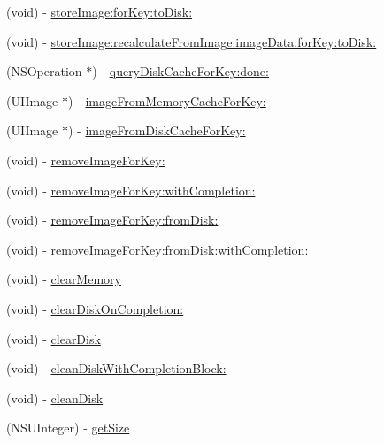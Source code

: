 \begin{DoxyCompactItemize}
\item 
(void) -\/ \mbox{\hyperlink{interface_s_d_image_cache_a558ee696fd5cb48edb05da606701fcec}{store\+Image\+:for\+Key\+:to\+Disk\+:}}
\item 
(void) -\/ \mbox{\hyperlink{interface_s_d_image_cache_a1724c0d0a91b64a097ec63a9934073bd}{store\+Image\+:recalculate\+From\+Image\+:image\+Data\+:for\+Key\+:to\+Disk\+:}}
\item 
(N\+S\+Operation $\ast$) -\/ \mbox{\hyperlink{interface_s_d_image_cache_a55f77fe338c314178df36dc68a4995fd}{query\+Disk\+Cache\+For\+Key\+:done\+:}}
\item 
(U\+I\+Image $\ast$) -\/ \mbox{\hyperlink{interface_s_d_image_cache_abe13b43b333bbb5bbe56142b8d573bd2}{image\+From\+Memory\+Cache\+For\+Key\+:}}
\item 
(U\+I\+Image $\ast$) -\/ \mbox{\hyperlink{interface_s_d_image_cache_ad3502d702952c60cd046ba4e7cba0197}{image\+From\+Disk\+Cache\+For\+Key\+:}}
\item 
(void) -\/ \mbox{\hyperlink{interface_s_d_image_cache_a1d6ca2afef59216e0cb1740d431833cf}{remove\+Image\+For\+Key\+:}}
\item 
(void) -\/ \mbox{\hyperlink{interface_s_d_image_cache_add965b440292c9da74fc85b395a9812a}{remove\+Image\+For\+Key\+:with\+Completion\+:}}
\item 
(void) -\/ \mbox{\hyperlink{interface_s_d_image_cache_a61cf4a9222043f0b302b8fdb0b522e3f}{remove\+Image\+For\+Key\+:from\+Disk\+:}}
\item 
(void) -\/ \mbox{\hyperlink{interface_s_d_image_cache_abf0e1a46fc6db455e464efda62fcc55d}{remove\+Image\+For\+Key\+:from\+Disk\+:with\+Completion\+:}}
\item 
(void) -\/ \mbox{\hyperlink{interface_s_d_image_cache_a931b161c379dd952affffe8c0544527d}{clear\+Memory}}
\item 
(void) -\/ \mbox{\hyperlink{interface_s_d_image_cache_ab936a83a1b711209d30f9051cc3658cc}{clear\+Disk\+On\+Completion\+:}}
\item 
(void) -\/ \mbox{\hyperlink{interface_s_d_image_cache_a2a9bcc872d749959df5dd458247b3301}{clear\+Disk}}
\item 
(void) -\/ \mbox{\hyperlink{interface_s_d_image_cache_a1f82c522f4cb0fafdb063291cbcb23d0}{clean\+Disk\+With\+Completion\+Block\+:}}
\item 
(void) -\/ \mbox{\hyperlink{interface_s_d_image_cache_a491f75cc5c1df37dce478c00f898a0d8}{clean\+Disk}}
\item 
(N\+S\+U\+Integer) -\/ \mbox{\hyperlink{interface_s_d_image_cache_a934d85543e92fdb3ac35cbdff3e668d3}{get\+Size}}

\end{DoxyCompactItemize}

